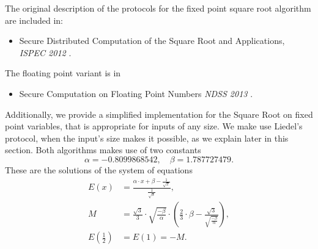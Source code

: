 The original description of the protocols for the fixed point square root algorithm are included in:
\begin{itemize}
  \item Secure Distributed Computation of the Square Root and Applications, {\em ISPEC 2012}
        \cite{Liedel12}.
\end{itemize}
The floating point variant is in
\begin{itemize}
  \item Secure Computation on Floating Point Numbers {\em NDSS 2013} \cite{ABZS13}.
\end{itemize}
Additionally, we provide a simplified implementation for the Square Root on fixed point variables, that is appropriate for inputs of any size. We make use Liedel's protocol, when the input's size makes it possible, as we explain later in this section.
Both algorithms makes use of two constants
\[ \alpha = -0.8099868542, \quad \beta  =  1.787727479.  \]
These are the solutions of the system of equations
\begin{align*}
  E(x)                       & = \frac{\alpha \cdot x+\beta-\frac{1}{\sqrt{x}}}{\frac{1}{\sqrt{x}}}, \\
  M                          & = \frac{\sqrt{3}}{3} \cdot \sqrt{\frac{-\beta}{\alpha}}
  \cdot \left(\frac{2}{3} \cdot\beta
  -\frac{\sqrt{3}}{\sqrt{\frac{-\beta}{\alpha}}}
  \right),                                                                                           \\
  E\left( \frac{1}{2}\right) & = E(1) = -M.
\end{align*}

